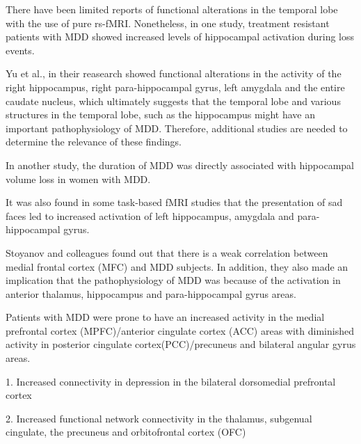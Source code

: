 \documentclass{article}
\begin{document}

There have been limited reports of functional alterations in the
temporal lobe with the use of pure rs-fMRI. Nonetheless, in one study,
treatment resistant patients with MDD showed increased levels of
hippocampal activation during loss events.

Yu et al., in their reasearch showed functional alterations in the
activity of the right hippocampus, right para-hippocampal gyrus, left
amygdala and the entire caudate nucleus, which ultimately suggests
that the temporal lobe and various structures in the temporal lobe,
such as the hippocampus might have an important pathophysiology of
MDD.  Therefore, additional studies are needed to determine the
relevance of these findings.

In another study, the duration of MDD was directly associated with
hippocampal volume loss in women with MDD.

It was also found in some task-based fMRI studies that the
presentation of sad faces led to increased activation of left
hippocampus, amygdala and para-hippocampal gyrus.

Stoyanov and colleagues found out that there is a weak correlation
between medial frontal cortex (MFC) and MDD subjects. In addition,
they also made an implication that the pathophysiology of MDD was
because of the activation in anterior thalamus, hippocampus and
para-hippocampal gyrus areas.

\iffalse


Patients with MDD were prone to have an increased activity in the
medial prefrontal cortex (MPFC)/anterior cingulate cortex (ACC) areas
with diminished activity in posterior cingulate cortex(PCC)/precuneus
and bilateral angular gyrus areas.


1. Increased connectivity in depression in the bilateral dorsomedial
   prefrontal cortex

2. Increased functional network connectivity in the
   thalamus, subgenual cingulate, the precuneus and orbitofrontal
   cortex (OFC)
\end{document}
